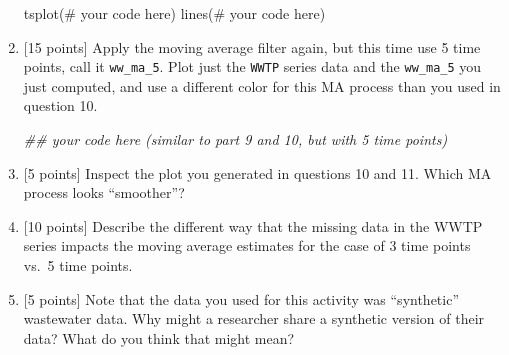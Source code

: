 \documentclass[
  letterpaper,
  DIV=11,
  numbers=noendperiod]{scrreprt}
\newenvironment{Shaded}{\begin{snugshade}}{\end{snugshade}}
\newcommand{\CommentTok}[1]{\textcolor[rgb]{0.37,0.37,0.37}{#1}}
\newcommand{\DocumentationTok}[1]{\textcolor[rgb]{0.37,0.37,0.37}{\textit{#1}}}
\newcommand{\FunctionTok}[1]{\textcolor[rgb]{0.28,0.35,0.67}{#1}}
\newcommand{\NormalTok}[1]{\textcolor[rgb]{0.00,0.23,0.31}{#1}}
\begin{document}
\begin{enumerate}
\begin{Shaded}
\begin{Highlighting}[]
\FunctionTok{tsplot}\NormalTok{(}\CommentTok{\# your code here)}
\FunctionTok{lines}\NormalTok{(}\CommentTok{\# your code here)}
\end{Highlighting}
\end{Shaded}
\item
  {[}15 points{]} Apply the moving average filter again, but this time
  use 5 time points, call it \texttt{ww\_ma\_5}. Plot just the
  \texttt{WWTP} series data and the \texttt{ww\_ma\_5} you just
  computed, and use a different color for this MA process than you used
  in question 10.

\begin{Shaded}
\begin{Highlighting}[]
\DocumentationTok{\#\# your code here (similar to part 9 and 10, but with 5 time points)}
\end{Highlighting}
\end{Shaded}
\item
  {[}5 points{]} Inspect the plot you generated in questions 10 and 11.
  Which MA process looks ``smoother''?
\item
  {[}10 points{]} Describe the different way that the missing data in
  the WWTP series impacts the moving average estimates for the case of 3
  time points vs.~5 time points.
\item
  {[}5 points{]} Note that the data you used for this activity was
  ``synthetic'' wastewater data. Why might a researcher share a
  synthetic version of their data? What do you think that might mean?
\end{enumerate}
\end{document}
